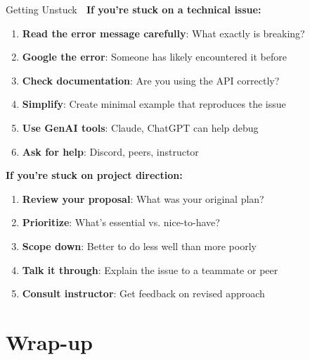 \documentclass[aspectratio=169]{beamer}
\begin{document}
\begin{frame}[shrink=10]{Getting Unstuck 🚀}
\textbf{If you're stuck on a technical issue:}
\begin{enumerate}\setlength{\itemsep}{0pt}
    \item \textbf{Read the error message carefully}: What exactly is breaking?
    \item \textbf{Google the error}: Someone has likely encountered it before
    \item \textbf{Check documentation}: Are you using the API correctly?
    \item \textbf{Simplify}: Create minimal example that reproduces the issue
    \item \textbf{Use GenAI tools}: Claude, ChatGPT can help debug
    \item \textbf{Ask for help}: Discord, peers, instructor
\end{enumerate}

\vspace{0.3cm}

\textbf{If you're stuck on project direction:}
\begin{enumerate}\setlength{\itemsep}{0pt}
    \item \textbf{Review your proposal}: What was your original plan?
    \item \textbf{Prioritize}: What's essential vs. nice-to-have?
    \item \textbf{Scope down}: Better to do less well than more poorly
    \item \textbf{Talk it through}: Explain the issue to a teammate or peer
    \item \textbf{Consult instructor}: Get feedback on revised approach
\end{enumerate}
\end{frame}

\section{Wrap-up}
\end{document}
